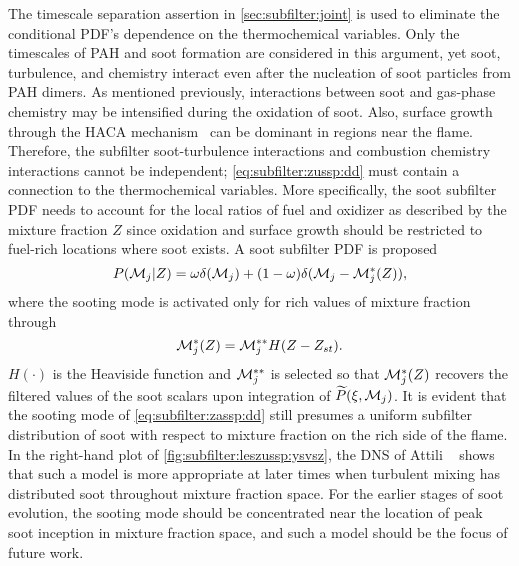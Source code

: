 The timescale separation assertion in \cref{sec:subfilter:joint} is used to eliminate the conditional PDF's dependence on the thermochemical variables. Only the timescales of PAH and soot formation are considered in this argument, yet soot, turbulence, and chemistry interact even after the nucleation of soot particles from PAH dimers. As mentioned previously, interactions between soot and gas-phase chemistry may be intensified during the oxidation of soot. Also, surface growth through the HACA mechanism~\cite{frenklach1985,frenklach1991} can be dominant in regions near the flame. Therefore, the subfilter soot-turbulence interactions and combustion chemistry interactions cannot be independent; \cref{eq:subfilter:zussp:dd} must contain a connection to the thermochemical variables. More specifically, the soot subfilter PDF needs to account for the local ratios of fuel and oxidizer as described by the mixture fraction $Z$ since oxidation and surface growth should be restricted to fuel-rich locations where soot exists. A soot subfilter PDF is proposed
\begin{equation}\label{eq:subfilter:zassp:dd}
  P(\mathcal{M}_j|Z) = \omega\delta(\mathcal{M}_j) + (1 - \omega)\delta(\mathcal{M}_j - \mathcal{M}_j^*(Z)),
\end{equation}
where the sooting mode is activated only for rich values of mixture fraction through
\begin{equation}\label{eq:subfilter:zassp:mstar}
  \mathcal{M}_j^*(Z) = \mathcal{M}_j^{**}H(Z - Z_{st}).
\end{equation}
$H(\cdot)$ is the Heaviside function and $\mathcal{M}_j^{**}$ is selected so that $\mathcal{M}_j^*(Z)$ recovers the filtered values of the soot scalars upon integration of $\widetilde{P}(\xi,\mathcal{M}_j)$. It is evident that the sooting mode of \cref{eq:subfilter:zassp:dd} still presumes a uniform subfilter distribution of soot with respect to mixture fraction on the rich side of the flame. In the right-hand plot of \cref{fig:subfilter:leszussp:ysvsz}, the DNS of Attili \etal~\cite{attili2014} shows that such a model is more appropriate at later times when turbulent mixing has distributed soot throughout mixture fraction space. For the earlier stages of soot evolution, the sooting mode should be concentrated near the location of peak soot inception in mixture fraction space, and such a model should be the focus of future work. %


